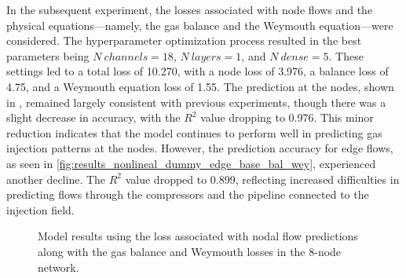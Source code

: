 In the subsequent experiment, the losses associated with node flows and the physical equations—namely, the gas balance and the Weymouth equation—were considered. The hyperparameter optimization process resulted in the best parameters being $N \ channels=18$, $N \ layers=1$, and $N \ dense=5$. These settings led to a total loss of 10.270, with a node loss of 3.976, a balance loss of 4.75, and a Weymouth equation loss of 1.55. The prediction at the nodes, shown in , remained largely consistent with previous experiments, though there was a slight decrease in accuracy, with the $R^2$ value dropping to 0.976. This minor reduction indicates that the model continues to perform well in predicting gas injection patterns at the nodes. However, the prediction accuracy for edge flows, as seen in \cref{fig:results_nonlineal_dummy_edge_base_bal_wey}, experienced another decline. The $R^2$ value dropped to 0.899, reflecting increased difficulties in predicting flows through the compressors and the pipeline connected to the injection field. 



\begin{figure}[h]
    \centering
    \setlength{}        
    \setlength{} 
    
    \caption{Model results using the loss associated with nodal flow predictions along with the gas balance and Weymouth losses in the 8-node network.}
    \label{fig:dummy_base_results}
\end{figure}



